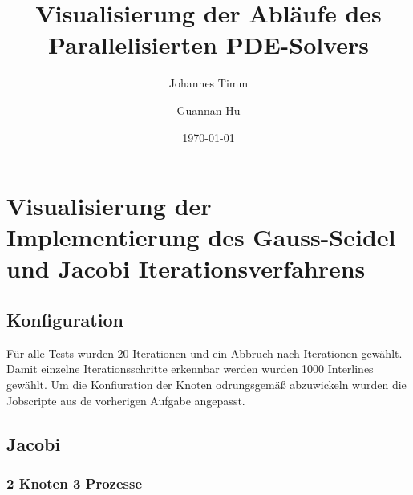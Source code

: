 \documentclass[a4paper,12pt]{scrartcl}
\title{Visualisierung der Abläufe des Parallelisierten PDE-Solvers}
\author{Johannes Timm \and Guannan Hu}
\date{\today}
\begin{document}
\maketitle
\notag

\section{Visualisierung der Implementierung des Gauss-Seidel und Jacobi Iterationsverfahrens}
\subsection{Konfiguration}
Für alle Tests wurden 20 Iterationen und ein Abbruch nach Iterationen gewählt. Damit einzelne Iterationsschritte erkennbar werden wurden 1000 Interlines gewählt. Um die Konfiuration der Knoten  odrungsgemäß abzuwickeln wurden die Jobscripte aus de vorherigen Aufgabe angepasst.
\subsection{Jacobi}
\subsubsection{2 Knoten 3 Prozesse}
\end{document}
